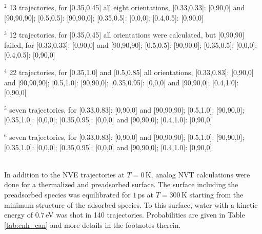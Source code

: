 \documentclass[11pt,DIV=13,BCOR=5mm,a4paper,headinclude]{scrbook}
\begin{document}
\begin{table}[hbt]
\begin{tablenotes}
\item[]$^2$ 13 trajectories, for [0.35,0.45] all eight orientations, [0.33,0.33]: [0,90,0] and [90,90,90]; [0.5,0.5]: [90,90,0]; [0.35,0.5]: [0,0,0]; [0.4,0.5]: [0,90,0]
\item[]$^3$ 12 trajectories, for [0.35,0.45] all orientations were calculated, but [0,90,90] failed, for [0.33,0.33]: [0,90,0] and [90,90,90]; [0.5,0.5]: [90,90,0]; [0.35,0.5]: [0,0,0]; [0.4,0.5]: [0,90,0]
\item[] $^4$ 22 trajectories, for [0.35,1.0] and [0.5,0.85] all orientations, [0.33,0.83]: [0,90,0] and [90,90,90]; [0.5,1.0]: [90,90,0]; [0.35,0.95]: [0,0,0] and [90,90,0]; [0.4,1.0]: [0,90,0]
\item[]$^5$ seven trajectories, for [0.33,0.83]: [0,90,0] and [90,90,90]; [0.5,1.0]: [90,90,0]; [0.35,1.0]: [0,0,0]; [0.35,0.95]: [0,0,0] and [90,90,0]; [0.4,1.0]: [0,90,0]
\item[]$^6$ seven trajectories, for [0.33,0.83]: [0,90,0] and [90,90,90]; [0.5,1.0]: [90,90,0]; [0.35,1.0]: [0,0,0]; [0.35,0.95]: [0,0,0] and [90,90,0]; [0.4,1.0]: [0,90,0]
\end{tablenotes}
 \label{tab:enh_micro}
\end{table}
\\
In addition to the NVE trajectories at $T=0\,$K, analog NVT calculations were done for a thermalized and preadsorbed surface.
The surface including the preadsorbed species was equilibrated for $1\,$ps at $T=300\,$K starting from the minimum structure of the adsorbed species.
To this surface, water with a kinetic energy of $0.7\,$eV was shot in 140 trajectories.
Probabilities are given in Table \ref{tab:enh_can} and more details in the footnotes therein.
\end{document}
